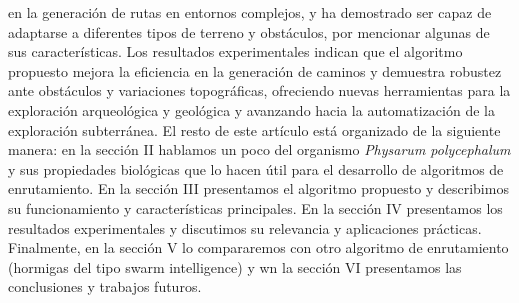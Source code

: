             en la generaci\'on de rutas en entornos complejos, y ha demostrado ser capaz de adaptarse a diferentes tipos de terreno y
            obst\'aculos, por mencionar algunas de sus caracter\'isticas. Los resultados experimentales indican que el algoritmo propuesto
            mejora la eficiencia en la generaci\'on de caminos y demuestra robustez ante obst\'aculos y variaciones topogr\'aficas, ofreciendo
            nuevas herramientas para la exploraci\'on arqueol\'ogica y geol\'ogica y avanzando hacia la automatizaci\'on de la exploraci\'on subterr\'anea.
    \vskip 0.5cm
        El resto de este art\'iculo est\'a organizado de la siguiente manera: en la secci\'on II hablamos un poco del organismo \textit{Physarum polycephalum}
            y sus propiedades biol\'ogicas que lo hacen \'util para el desarrollo de algoritmos de enrutamiento. En la secci\'on III presentamos el algoritmo
            propuesto y describimos su funcionamiento y caracter\'isticas principales. En la secci\'on IV presentamos los resultados experimentales y discutimos
            su relevancia y aplicaciones pr\'acticas. Finalmente, en la secci\'on V lo compararemos con otro algoritmo de enrutamiento (hormigas del tipo swarm intelligence)
            y wn la secci\'on VI presentamos las conclusiones y trabajos futuros. 
            